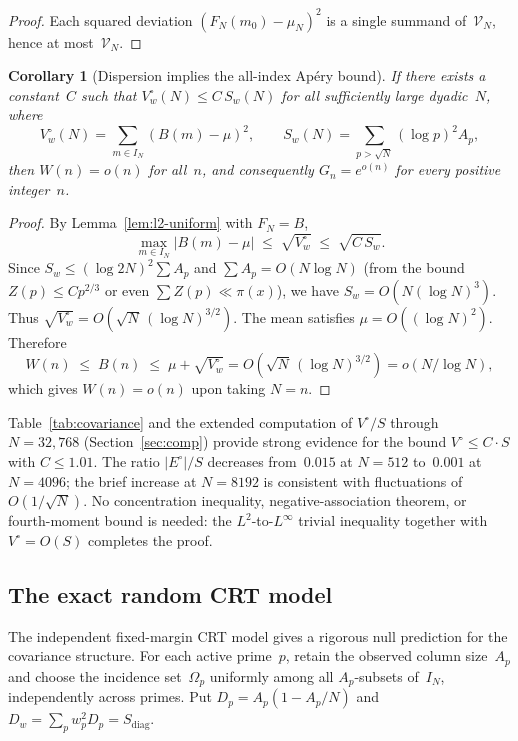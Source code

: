 \documentclass[11pt]{article}
\newtheorem{corollary}[theorem]{Corollary}
\theoremstyle{definition}
\theoremstyle{remark}
\begin{document}
\begin{proof}
Each squared deviation $(F_N(m_0) - \mu_N)^2$ is a single summand
of~$\mathcal{V}_N$, hence at most~$\mathcal{V}_N$.
\end{proof}

\begin{corollary}[Dispersion implies the all-index Ap\'ery bound]
\label{cor:dispersion-alln}
If there exists a constant~$C$ such that
$V^\circ_w(N) \le C\,S_w(N)$ for all sufficiently
large dyadic~$N$, where
\[
  V^\circ_w(N) = \sum_{m \in I_N}(B(m) - \mu)^2,
  \qquad
  S_w(N) = \sum_{p > \sqrt{N}} (\log p)^2 A_p,
\]
then $W(n) = o(n)$ for all~$n$, and consequently
$G_n = e^{o(n)}$ for every positive integer~$n$.
\end{corollary}

\begin{proof}
By Lemma~\ref{lem:l2-uniform} with $F_N = B$,
\[
  \max_{m \in I_N} |B(m) - \mu| \;\le\; \sqrt{V^\circ_w}
  \;\le\; \sqrt{C\,S_w}.
\]
Since $S_w \le (\log 2N)^2 \sum A_p$ and
$\sum A_p = O(N\log N)$ (from the bound
$Z(p) \le Cp^{2/3}$ or even $\sum Z(p) \ll \pi(x)$),
we have $S_w = O(N(\log N)^3)$.
Thus $\sqrt{V^\circ_w} = O(\sqrt{N}\,(\log N)^{3/2})$.
The mean satisfies $\mu = O((\log N)^2)$.
Therefore
\[
  W(n) \;\le\; B(n) \;\le\; \mu + \sqrt{V^\circ_w}
  = O(\sqrt{N}\,(\log N)^{3/2}) = o(N/\!\log N),
\]
which gives $W(n) = o(n)$ upon taking
$N = n$.
\end{proof}

Table~\ref{tab:covariance} and the extended computation of
$V^\circ/S$ through $N = 32{,}768$
(Section~\ref{sec:comp}) provide strong evidence
for the bound $V^\circ \le C\cdot S$ with
$C \le 1.01$.
The ratio $|E^\circ|/S$ decreases from~$0.015$
at $N = 512$ to~$0.001$ at $N = 4096$;
the brief increase at $N = 8192$ is consistent
with fluctuations of $O(1/\!\sqrt{N})$.
No concentration inequality, negative-association
theorem, or fourth-moment bound is needed:
the $L^2$-to-$L^\infty$ trivial inequality
together with $V^\circ = O(S)$ completes the proof.

\subsection{The exact random CRT model}\label{ssec:random-crt-model}

The independent fixed-margin CRT model gives a
rigorous null prediction for the covariance structure.
For each active prime~$p$, retain the observed column size~$A_p$
and choose the incidence set~$\Omega_p$
uniformly among all $A_p$-subsets of~$I_N$,
independently across primes.
Put $D_p = A_p(1 - A_p/N)$ and
$D_w = \sum_p w_p^2 D_p = S_{\mathrm{diag}}$.
\end{document}
